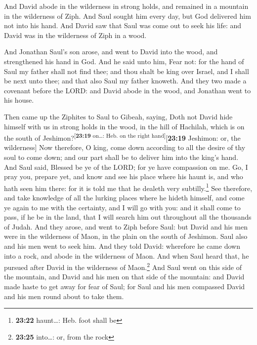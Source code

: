  And David abode in the wilderness in strong holds, and
remained in a mountain in the wilderness of Ziph. And Saul sought him
every day, but God delivered him not into his hand.  And
David saw that Saul was come out to seek his life: and David was in the
wilderness of Ziph in a wood.

 And Jonathan Saul's son arose, and went to David into
the wood, and strengthened his hand in God.  And he said
unto him, Fear not: for the hand of Saul my father shall not find thee;
and thou shalt be king over Israel, and I shall be next unto thee; and
that also Saul my father knoweth.  And they two made a
covenant before the LORD: and David abode in the wood, and Jonathan went
to his house.

 Then came up the Ziphites to Saul to Gibeah, saying,
Doth not David hide himself with us in strong holds in the wood, in the
hill of Hachilah, which is on the south of
Jeshimon?\textsuperscript{{[}\textbf{23:19} on\ldots: Heb. on the right
hand{]}}{[}\textbf{23:19} Jeshimon: or, the wilderness{]}
 Now therefore, O king, come down according to all the
desire of thy soul to come down; and our part shall be to deliver him
into the king's hand.  And Saul said, Blessed be ye of
the LORD; for ye have compassion on me.  Go, I pray you,
prepare yet, and know and see his place where his haunt is, and who hath
seen him there: for it is told me that he dealeth very
subtilly.\footnote{\textbf{23:22} haunt\ldots: Heb. foot shall be}
 See therefore, and take knowledge of all the lurking
places where he hideth himself, and come ye again to me with the
certainty, and I will go with you: and it shall come to pass, if he be
in the land, that I will search him out throughout all the thousands of
Judah.  And they arose, and went to Ziph before Saul: but
David and his men were in the wilderness of Maon, in the plain on the
south of Jeshimon.  Saul also and his men went to seek
him. And they told David: wherefore he came down into a rock, and abode
in the wilderness of Maon. And when Saul heard that, he pursued after
David in the wilderness of Maon.\footnote{\textbf{23:25} into\ldots: or,
  from the rock}  And Saul went on this side of the
mountain, and David and his men on that side of the mountain: and David
made haste to get away for fear of Saul; for Saul and his men compassed
David and his men round about to take them.

